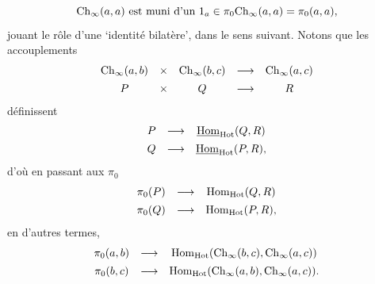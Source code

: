 \[
\mathrm{Ch}_\infty(a,a) \text{ est muni d'un } 1_a \in \pi_0\mathrm{Ch}_\infty(a,a) = \pi_0(a,a),
\]
jouant le rôle d'une `identité bilatère', dans le sens suivant. Notons que les accouplements
\[
\begin{array}{ccccc}
\mathrm{Ch}_\infty(a,b) & \times & \mathrm{Ch}_\infty(b,c) & \longrightarrow & \mathrm{Ch}_\infty(a,c) \\[1ex]
P & \times & Q & \longrightarrow & R
\end{array}
\]
définissent
\[
\begin{array}{ccc}
P & \longrightarrow & \underline{\mathrm{Hom}}_{\mathrm{Hot}}(Q,R) \\[1ex]
Q & \longrightarrow & \underline{\mathrm{Hom}}_{\mathrm{Hot}}(P,R),
\end{array}
\]
d'où en passant aux $\pi_0$
\[
\begin{array}{ccc}
\pi_0(P) & \longrightarrow & \mathrm{Hom}_{\mathrm{Hot}}(Q,R) \\[1ex]
\pi_0(Q) & \longrightarrow & \mathrm{Hom}_{\mathrm{Hot}}(P,R),
\end{array}
\]
en d'autres termes,
\[
\begin{array}{ccc}
\pi_0(a,b) & \longrightarrow & \mathrm{Hom}_{\mathrm{Hot}}(\mathrm{Ch}_\infty(b,c),\mathrm{Ch}_\infty(a,c)) \\[1ex]
\pi_0(b,c) & \longrightarrow & \mathrm{Hom}_{\mathrm{Hot}}(\mathrm{Ch}_\infty(a,b),\mathrm{Ch}_\infty(a,c)).
\end{array}
\]

